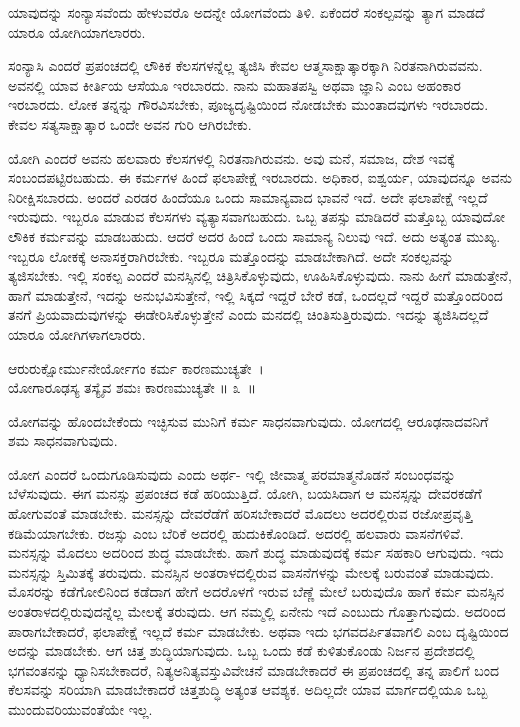 \begin{artha}
ಯಾವುದನ್ನು ಸಂನ್ಯಾಸವೆಂದು ಹೇಳುವರೊ ಅದನ್ನೇ ಯೋಗವೆಂದು ತಿಳಿ. ಏಕೆಂದರೆ ಸಂಕಲ್ಪವನ್ನು ತ್ಯಾಗ ಮಾಡದೆ ಯಾರೂ ಯೋಗಿಯಾಗಲಾರರು.
\end{artha}

ಸಂನ್ಯಾಸಿ ಎಂದರೆ ಪ್ರಪಂಚದಲ್ಲಿ ಲೌಕಿಕ ಕೆಲಸಗಳನ್ನೆಲ್ಲ ತ್ಯಜಿಸಿ ಕೇವಲ ಆತ್ಮಸಾಕ್ಷಾತ್ಕಾರಕ್ಕಾಗಿ ನಿರತನಾಗಿರುವವನು. ಅವನಲ್ಲಿ ಯಾವ ಕೀರ್ತಿಯ ಆಸೆಯೂ ಇರಬಾರದು. ನಾನು ಮಹಾತಪಸ್ವಿ ಅಥವಾ ಜ್ಞಾನಿ ಎಂಬ ಅಹಂಕಾರ ಇರಬಾರದು. ಲೋಕ ತನ್ನನ್ನು ಗೌರವಿಸಬೇಕು, ಪೂಜ್ಯದೃಷ್ಟಿಯಿಂದ ನೋಡಬೇಕು ಮುಂತಾದವುಗಳು ಇರಬಾರದು. ಕೇವಲ ಸತ್ಯಸಾಕ್ಷಾತ್ಕಾರ ಒಂದೇ ಅವನ ಗುರಿ ಆಗಿರಬೇಕು.

ಯೋಗಿ ಎಂದರೆ ಅವನು ಹಲವಾರು ಕೆಲಸಗಳಲ್ಲಿ ನಿರತನಾಗಿರುವನು. ಅವು ಮನೆ, ಸಮಾಜ, ದೇಶ ಇವಕ್ಕೆ ಸಂಬಂದಪಟ್ಟಿರಬಹುದು. ಈ ಕರ್ಮಗಳ ಹಿಂದೆ ಫಲಾಪೇಕ್ಷೆ ಇರಬಾರದು. ಅಧಿಕಾರ, ಐಶ್ವರ್ಯ, ಯಾವುದನ್ನೂ ಅವನು ನಿರೀಕ್ಷಿಸಬಾರದು. ಅಂದರೆ ಎರಡರ ಹಿಂದೆಯೂ ಒಂದು ಸಾಮಾನ್ಯವಾದ ಭಾವನೆ ಇದೆ. ಅದೇ ಫಲಾಪೇಕ್ಷೆ ಇಲ್ಲದೆ ಇರುವುದು. ಇಬ್ಬರೂ ಮಾಡುವ ಕೆಲಸಗಳು ವ್ಯತ್ಯಾಸವಾಗಬಹುದು. ಒಬ್ಬ ತಪಸ್ಸು ಮಾಡಿದರೆ ಮತ್ತೊಬ್ಬ ಯಾವುದೋ ಲೌಕಿಕ ಕರ್ಮವನ್ನು ಮಾಡಬಹುದು. ಆದರೆ ಅದರ ಹಿಂದೆ ಒಂದು ಸಾಮಾನ್ಯ ನಿಲುವು ಇದೆ. ಅದು ಅತ್ಯಂತ ಮುಖ್ಯ. ಇಬ್ಬರೂ ಲೋಕಕ್ಕೆ ಅನಾಸಕ್ತರಾಗಿರಬೇಕು. ಇಬ್ಬರೂ ಮತ್ತೊಂದನ್ನು ಮಾಡಬೇಕಾಗಿದೆ. ಅದೇ ಸಂಕಲ್ಪವನ್ನು ತ್ಯಜಿಸಬೇಕು. ಇಲ್ಲಿ ಸಂಕಲ್ಪ ಎಂದರೆ ಮನಸ್ಸಿನಲ್ಲಿ ಚಿತ್ರಿಸಿಕೊಳ್ಳುವುದು, ಊಹಿಸಿಕೊಳ್ಳುವುದು. ನಾನು ಹೀಗೆ ಮಾಡುತ್ತೇನೆ, ಹಾಗೆ ಮಾಡುತ್ತೇನೆ, ಇದನ್ನು ಅನುಭವಿಸುತ್ತೇನೆ, ಇಲ್ಲಿ ಸಿಕ್ಕದೆ ಇದ್ದರೆ ಬೇರೆ ಕಡೆ, ಒಂದಲ್ಲದೆ ಇದ್ದರೆ ಮತ್ತೊಂದರಿಂದ ತನಗೆ ಪ್ರಿಯವಾದುವುಗಳನ್ನು ಈಡೇರಿಸಿಕೊಳ್ಳುತ್ತೇನೆ ಎಂದು ಮನದಲ್ಲಿ ಚಿಂತಿಸುತ್ತಿರುವುದು. ಇದನ್ನು ತ್ಯಜಿಸಿದಲ್ಲದೆ ಯಾರೂ ಯೋಗಿಗಳಾಗಲಾರರು. 

\begin{shloka}
ಆರುರುಕ್ಷೋರ್ಮುನೇರ್ಯೋಗಂ ಕರ್ಮ ಕಾರಣಮುಚ್ಯತೇ~।\\ಯೋಗಾರೂಢಸ್ಯ ತಸ್ಯೈವ ಶಮಃ ಕಾರಣಮುಚ್ಯತೇ \hfill॥ ೩~॥
\end{shloka}

\begin{artha}
ಯೋಗವನ್ನು ಹೊಂದಬೇಕೆಂದು ಇಚ್ಛಿಸುವ ಮುನಿಗೆ ಕರ್ಮ ಸಾಧನವಾಗುವುದು. ಯೋಗದಲ್ಲಿ ಆರೂಢನಾದವನಿಗೆ ಶಮ ಸಾಧನವಾಗುವುದು.
\end{artha}

ಯೋಗ ಎಂದರೆ ಒಂದುಗೂಡಿಸುವುದು ಎಂದು ಅರ್ಥ- ಇಲ್ಲಿ ಜೀವಾತ್ಮ ಪರಮಾತ್ಮನೊಡನೆ ಸಂಬಂಧವನ್ನು ಬೆಳೆಸುವುದು. ಈಗ ಮನಸ್ಸು ಪ್ರಪಂಚದ ಕಡೆ ಹರಿಯುತ್ತಿದೆ. ಯೋಗಿ, ಬಯಸಿದಾಗ ಆ ಮನಸ್ಸನ್ನು ದೇವರಕಡೆಗೆ ಹೋಗುವಂತೆ ಮಾಡಬೇಕು. ಮನಸ್ಸನ್ನು ದೇವರೆಡೆಗೆ ಹರಿಸಬೇಕಾದರೆ ಮೊದಲು ಅದರಲ್ಲಿರುವ ರಜೋಪ್ರವೃತ್ತಿ ಕಡಿಮೆಯಾಗಬೇಕು. ರಜಸ್ಸು ಎಂಬ ಬೆರಿಕೆ ಅದರಲ್ಲಿ ಹುದುಕಿಕೊಂಡಿದೆ. ಅದರಲ್ಲಿ ಹಲವಾರು ವಾಸನೆಗಳಿವೆ. ಮನಸ್ಸನ್ನು ಮೊದಲು ಅದರಿಂದ ಶುದ್ಧ ಮಾಡಬೇಕು. ಹಾಗೆ ಶುದ್ಧ ಮಾಡುವುದಕ್ಕೆ ಕರ್ಮ ಸಹಕಾರಿ ಆಗುವುದು. ಇದು ಮನಸ್ಸನ್ನು ಸ್ತಿಮಿತಕ್ಕೆ ತರುವುದು. ಮನಸ್ಸಿನ ಅಂತರಾಳದಲ್ಲಿರುವ ವಾಸನೆಗಳನ್ನು ಮೇಲಕ್ಕೆ ಬರುವಂತೆ ಮಾಡುವುದು. ಮೊಸರನ್ನು ಕಡೆಗೋಲಿನಿಂದ ಕಡೆದಾಗ ಹೇಗೆ ಅದರೊಳಗೆ ಇರುವ ಬೆಣ್ಣೆ ಮೇಲೆ ಬರುವುದೊ ಹಾಗೆ ಕರ್ಮ ಮನಸ್ಸಿನ ಅಂತರಾಳದಲ್ಲಿರುವುದನ್ನೆಲ್ಲ ಮೇಲಕ್ಕೆ ತರುವುದು. ಆಗ ನಮ್ಮಲ್ಲಿ ಏನೇನು ಇದೆ ಎಂಬುದು ಗೊತ್ತಾಗುವುದು. ಅದರಿಂದ ಪಾರಾಗಬೇಕಾದರೆ, ಫಲಾಪೇಕ್ಷೆ ಇಲ್ಲದೆ ಕರ್ಮ ಮಾಡಬೇಕು. ಅಥವಾ ಇದು ಭಗವದರ್ಪಿತವಾಗಲಿ ಎಂಬ ದೃಷ್ಟಿಯಿಂದ ಅದನ್ನು ಮಾಡಬೇಕು. ಆಗ ಚಿತ್ತ ಶುದ್ಧಿಯಾಗುವುದು. ಒಬ್ಬ ಒಂದು ಕಡೆ ಕುಳಿತುಕೊಂಡು ನಿರ್ಜನ ಪ್ರದೇಶದಲ್ಲಿ ಭಗವಂತನನ್ನು ಧ್ಯಾನಿಸಬೇಕಾದರೆ, ನಿತ್ಯಅನಿತ್ಯವಸ್ತುವಿವೇಚನೆ ಮಾಡಬೇಕಾದರೆ ಈ ಪ್ರಪಂಚದಲ್ಲಿ ತನ್ನ ಪಾಲಿಗೆ ಬಂದ ಕೆಲಸವನ್ನು ಸರಿಯಾಗಿ ಮಾಡಬೇಕಾದರೆ ಚಿತ್ತಶುದ್ಧಿ ಅತ್ಯಂತ ಆವಶ್ಯಕ. ಅದಿಲ್ಲದೇ ಯಾವ ಮಾರ್ಗದಲ್ಲಿಯೂ ಒಬ್ಬ ಮುಂದುವರಿಯು\-ವಂತೆಯೇ ಇಲ್ಲ.

